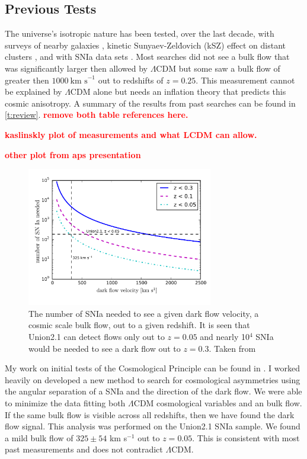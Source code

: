 \documentclass[apj, iop]{emulateapj}
\newcommand{\sn}{SNIa}
\newcommand{\todo}[1]{\textbf{\textcolor{red}{#1}}}
\newcommand{\lcdm}{$\Lambda$CDM}     %
\newcommand{\kms}{\ensuremath{~\text{km s}^{-1}}}
\begin{document}
\subsection{Previous Tests}\label{previous-tests}

The universe's isotropic nature has been tested, over the last decade, with
surveys of nearby galaxies \citep{Ma13}, kinetic Sunyaev-Zel\'{d}ovich (kSZ)
effect on distant clusters \citep{Kashlinsky10,Planckdf}, and with \sn{} data
sets \citep[and others as seen in ]{Dai11,Rathaus13}. Most
searches did not see a bulk flow that was significantly larger then allowed by
\lcdm{} but some saw a bulk flow of greater then $1000 \kms{}$ out to
redshifts of $z = 0.25$. This measurement cannot be explained by $\Lambda$CDM
alone but needs an inflation theory that predicts this cosmic anisotropy.  A
summary of the results from past searches can be found in \cref{t:review}.
\todo{remove both table references here.}

\todo{kaslinskly plot of measurements and what LCDM can allow.}

\todo{other plot from aps presentation}

\begin{figure}
	\includegraphics[width=3.2in]{what_dataset_size_v_velocity.pdf} 
    \caption{The number of \sn{} needed to see a given dark flow velocity, a
	cosmic scale bulk flow, out to a given redshift. It is seen that Union2.1 
	can detect flows only out to $z=0.05$ and nearly 10$^4$ \sn{} would be 
	needed to see a dark flow out to $z=0.3$. Taken from \cite{Mathews16}}
	\label{f:sn-needed} 
\end{figure}

My work on initial tests of the Cosmological Principle can be found in
\cite{Mathews16}. I worked heavily on developed a new method to search for
cosmological asymmetries using the angular separation of a \sn{} and the
direction of the dark flow. We were able to minimize the data fitting both
\lcdm{} cosmological variables and  an bulk flow. If the same bulk flow is
visible across all redshifts, then we have found the dark flow signal. This
analysis was performed on the Union2.1 \citep{Suzuki12} \sn{} sample. We found a
mild bulk flow of $325 \pm 54$ km s$^{-1}$ out to $z = 0.05$. This is consistent
with most past measurements and does not contradict \lcdm{}.
\end{document}
